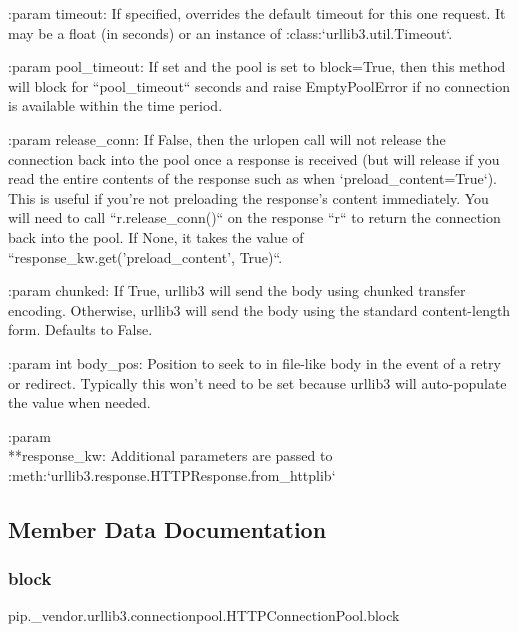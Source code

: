 \begin{DoxyVerb}
:param timeout:
    If specified, overrides the default timeout for this one
    request. It may be a float (in seconds) or an instance of
    :class:`urllib3.util.Timeout`.

:param pool_timeout:
    If set and the pool is set to block=True, then this method will
    block for ``pool_timeout`` seconds and raise EmptyPoolError if no
    connection is available within the time period.

:param release_conn:
    If False, then the urlopen call will not release the connection
    back into the pool once a response is received (but will release if
    you read the entire contents of the response such as when
    `preload_content=True`). This is useful if you're not preloading
    the response's content immediately. You will need to call
    ``r.release_conn()`` on the response ``r`` to return the connection
    back into the pool. If None, it takes the value of
    ``response_kw.get('preload_content', True)``.

:param chunked:
    If True, urllib3 will send the body using chunked transfer
    encoding. Otherwise, urllib3 will send the body using the standard
    content-length form. Defaults to False.

:param int body_pos:
    Position to seek to in file-like body in the event of a retry or
    redirect. Typically this won't need to be set because urllib3 will
    auto-populate the value when needed.

:param \\**response_kw:
    Additional parameters are passed to
    :meth:`urllib3.response.HTTPResponse.from_httplib`
\end{DoxyVerb}
 

\subsection{Member Data Documentation}
\mbox{\label{classpip_1_1__vendor_1_1urllib3_1_1connectionpool_1_1HTTPConnectionPool_ab75440494cfe89f84809b416845fea8c}} 
\subsubsection{\texorpdfstring{block}{block}}
{\footnotesize\ttfamily pip.\+\_\+vendor.\+urllib3.\+connectionpool.\+H\+T\+T\+P\+Connection\+Pool.\+block}


